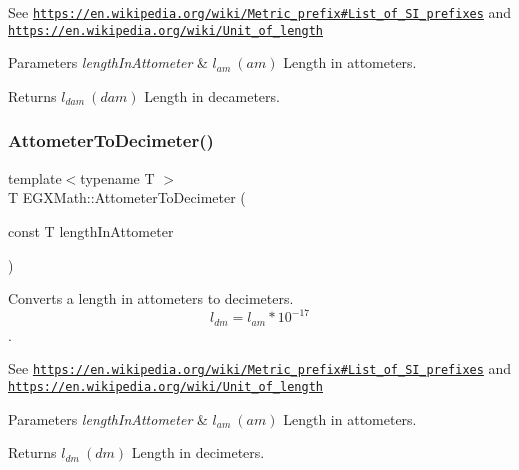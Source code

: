 See \href{https://en.wikipedia.org/wiki/Metric_prefix#List_of_SI_prefixes}{\tt https\+://en.\+wikipedia.\+org/wiki/\+Metric\+\_\+prefix\#\+List\+\_\+of\+\_\+\+S\+I\+\_\+prefixes} and \href{https://en.wikipedia.org/wiki/Unit_of_length}{\tt https\+://en.\+wikipedia.\+org/wiki/\+Unit\+\_\+of\+\_\+length} 
\begin{DoxyParams}{Parameters}
{\em length\+In\+Attometer} & $ l_{am}\ (am)$ Length in attometers. \\
\hline
\end{DoxyParams}
\begin{DoxyReturn}{Returns}
$ l_{dam}\ (dam)$ Length in decameters. 
\end{DoxyReturn}
\mbox{\label{group___e_g_x_math-_conversions-_length_conversions-_attometer-_s_i_gaa819fb588dcc42855d8e40578b54527e}} 
\subsubsection{\texorpdfstring{Attometer\+To\+Decimeter()}{AttometerToDecimeter()}}
{\footnotesize\ttfamily template$<$typename T $>$ \\
T E\+G\+X\+Math\+::\+Attometer\+To\+Decimeter (\begin{DoxyParamCaption}\item[{const T}]{length\+In\+Attometer }\end{DoxyParamCaption})}



Converts a length in attometers to decimeters. \[ l_{dm}=l_{am} * 10^{-17} \]. 

See \href{https://en.wikipedia.org/wiki/Metric_prefix#List_of_SI_prefixes}{\tt https\+://en.\+wikipedia.\+org/wiki/\+Metric\+\_\+prefix\#\+List\+\_\+of\+\_\+\+S\+I\+\_\+prefixes} and \href{https://en.wikipedia.org/wiki/Unit_of_length}{\tt https\+://en.\+wikipedia.\+org/wiki/\+Unit\+\_\+of\+\_\+length} 
\begin{DoxyParams}{Parameters}
{\em length\+In\+Attometer} & $ l_{am}\ (am)$ Length in attometers. \\
\hline
\end{DoxyParams}
\begin{DoxyReturn}{Returns}
$ l_{dm}\ (dm)$ Length in decimeters. 
\end{DoxyReturn}
\mbox{\label{group___e_g_x_math-_conversions-_length_conversions-_attometer-_s_i_gaca9be6820446effaa50024d2ccc3eea8}} 
